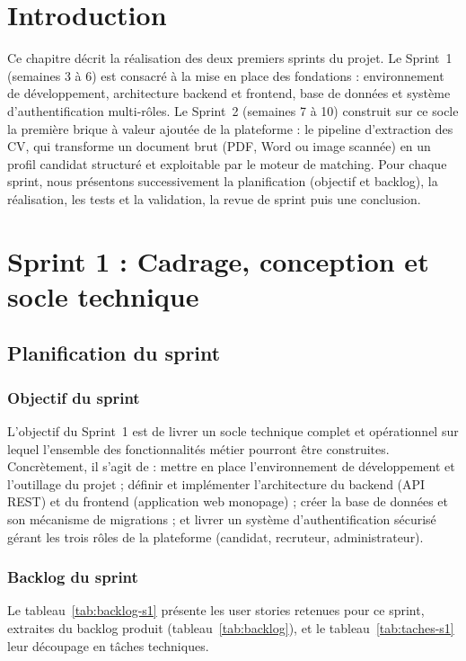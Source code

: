 \documentclass[12pt,a4paper]{report}
\begin{document}
\section{Introduction}

Ce chapitre décrit la réalisation des deux premiers sprints du projet. Le Sprint~1 (semaines 3 à 6) est consacré à la mise en place des fondations : environnement de développement, architecture backend et frontend, base de données et système d'authentification multi-rôles. Le Sprint~2 (semaines 7 à 10) construit sur ce socle la première brique à valeur ajoutée de la plateforme : le pipeline d'extraction des CV, qui transforme un document brut (PDF, Word ou image scannée) en un profil candidat structuré et exploitable par le moteur de matching. Pour chaque sprint, nous présentons successivement la planification (objectif et backlog), la réalisation, les tests et la validation, la revue de sprint puis une conclusion.

\section{Sprint 1 : Cadrage, conception et socle technique}

\subsection{Planification du sprint}

\subsubsection{Objectif du sprint}

L'objectif du Sprint~1 est de livrer un socle technique complet et opérationnel sur lequel l'ensemble des fonctionnalités métier pourront être construites. Concrètement, il s'agit de : mettre en place l'environnement de développement et l'outillage du projet ; définir et implémenter l'architecture du backend (API REST) et du frontend (application web monopage) ; créer la base de données et son mécanisme de migrations ; et livrer un système d'authentification sécurisé gérant les trois rôles de la plateforme (candidat, recruteur, administrateur).

\subsubsection{Backlog du sprint}

Le tableau~\ref{tab:backlog-s1} présente les user stories retenues pour ce sprint, extraites du backlog produit (tableau~\ref{tab:backlog}), et le tableau~\ref{tab:taches-s1} leur découpage en tâches techniques.
\end{document}
